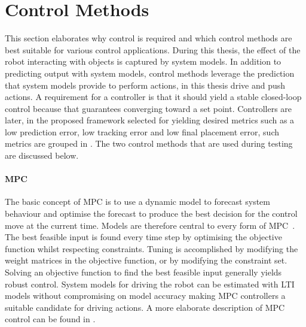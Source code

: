 \section{Control Methods}%
\label{sec:control_methods}
This section elaborates why control is required and which control methods are best suitable for various control applications. During this thesis, the effect of the robot interacting with objects is captured by system models. In addition to predicting output with system models, control methods leverage the prediction that system models provide to perform actions, in this thesis drive and push actions. A requirement for a controller is that it should yield a stable closed-loop control because that guarantees converging toward a set point. Controllers are later, in the proposed framework selected for yielding desired metrics such as a low prediction error, low tracking error and low final placement error, such metrics are grouped in . The two control methods that are used during testing are discussed below.\bs

\paragraph{\acl{MPC}}
The basic concept of \ac{MPC} is to use a dynamic model to forecast system behaviour and optimise the forecast to produce the best decision for the control move at the current time. Models are therefore central to every form of \ac{MPC}~\cite{rawlings_model_2020}. The best feasible input is found every time step by optimising the objective function whilst respecting constraints. Tuning is accomplished by modifying the weight matrices in the objective function, or by modifying the constraint set. Solving an objective function to find the best feasible input generally yields robust control. System models for driving the robot can be estimated with \ac{LTI} models without compromising on model accuracy making \ac{MPC} controllers a suitable candidate for driving actions. A more elaborate description of \ac{MPC} control can be found in .

